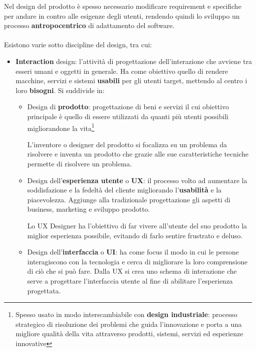 Nel design del prodotto è spesso necessario modificare requirement e specifiche per andare in contro alle esigenze degli utenti, rendendo quindi lo sviluppo un processo \textbf{antropocentrico} di adattamento del software.\\\\
Esistono varie sotto discipline del design, tra cui:
\begin{itemize}
	\item \textbf{Interaction} design: l'attività di progettazione dell'interazione che avviene tra esseri umani e oggetti in generale. Ha come obiettivo quello di rendere macchine, servizi e sistemi \textbf{usabili} per gli utenti target, mettendo al centro i loro \textbf{bisogni}. Si suddivide in:
	\begin{itemize}
		\item Design di \textbf{prodotto}: progettazione di beni e servizi il cui obiettivo principale è quello di essere utilizzati da quanti più utenti possibili migliorandone la vita\footnote{Spesso usato in modo interscambiabile con \textbf{design industriale}: processo strategico di risoluzione dei problemi che guida l'innovazione e porta a una migliore qualità della vita attraverso prodotti, sistemi, servizi ed esperienze innovative}
		\begin{definition}[Designer]
			L'inventore o designer del prodotto si focalizza su un problema da risolvere e inventa un prodotto che grazie alle sue caratteristiche tecniche permette di risolvere un problema.
		\end{definition}
		\item Design dell'\textbf{esperienza utente} o \textbf{UX}: il processo volto ad aumentare la soddisfazione e la fedeltà del cliente migliorando l'\textbf{usabilità} e la piacevolezza. Aggiunge alla tradizionale progettazione gli aspetti di business, marketing e sviluppo prodotto.
		\begin{definition}[UX Designer]
			Lo UX Designer ha l'obiettivo di far vivere all'utente del suo prodotto la miglior esperienza possibile, evitando di farlo sentire frustrato e deluso.
		\end{definition}
		\item Design dell'\textbf{interfaccia} o \textbf{UI}: ha come focus il modo in cui le persone interagiscono con la tecnologia e cerca di migliorare la loro comprensione di ciò che si può fare. Dalla UX si crea uno schema di interazione che serve a progettare l'interfaccia utente al fine di abilitare l'esperienza progettata.
		\begin{definition}[UI Designer]

\end{definition}
\end{itemize}
\end{itemize}
